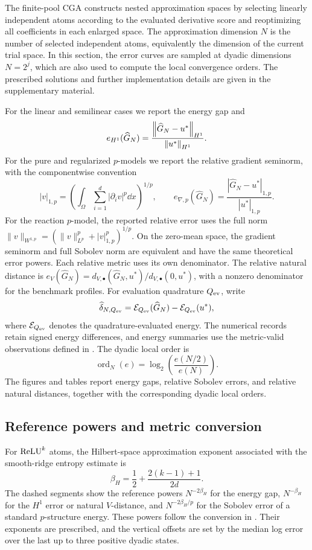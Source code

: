The finite-pool CGA constructs nested approximation spaces by selecting linearly independent atoms according to the evaluated derivative score and reoptimizing all coefficients in each enlarged space. The approximation dimension \(N\) is the number of selected independent atoms, equivalently the dimension of the current trial space. In this section, the error curves are sampled at dyadic dimensions \(N=2^j\), which are also used to compute the local convergence orders. The prescribed solutions and further implementation details are given in the supplementary material.

For the linear and semilinear cases we report the energy gap and
\[
 e_{H^1}(\widehat G_N)=\frac{\left\lVert \widehat G_N-u^*\right\rVert_{H^1}}{\left\lVert u^*\right\rVert_{H^1}}.
\]
For the pure and regularized \(p\)-models we report the relative gradient
seminorm, with the componentwise convention
\[
 |v|_{1,p}=\left(\int_\Omega\sum_{i=1}^d|\partial_i v|^p\dd x\right)^{1/p},
 \qquad e_{\nabla,p}(\widehat G_N)=
 \frac{|\widehat G_N-u^*|_{1,p}}{|u^*|_{1,p}}.
\]
For the reaction \(p\)-model, the reported relative error uses the full norm
\(\|v\|_{W^{1,p}}=(\|v\|_{L^p}^p+|v|_{1,p}^p)^{1/p}\).
On the zero-mean space, the gradient seminorm and full Sobolev norm are equivalent and have the same theoretical error powers. Each relative metric uses its own denominator. The relative natural distance is \(e_V(\widehat G_N)=d_{V,\bullet}(\widehat G_N,u^*)/d_{V,\bullet}(0,u^*)\), with a nonzero denominator for the benchmark profiles. For evaluation quadrature \(Q_{\rm ev}\), write
\[
 \widehat\delta_{N,Q_{\rm ev}}=\mathcal{E}_{Q_{\rm ev}}(\widehat G_N)-\mathcal{E}_{Q_{\rm ev}}(u^*),
\]
where \(\mathcal{E}_{Q_{\rm ev}}\) denotes the quadrature-evaluated energy. The numerical records retain signed energy differences, and energy summaries use the metric-valid observations defined in .
The dyadic local order is
\[
 \operatorname{ord}_N(e)=\log_2\!\left(\frac{e(N/2)}{e(N)}\right).
\]
The figures and tables report energy gaps, relative Sobolev errors, and relative natural distances, together with the corresponding dyadic local orders.

\subsection{Reference powers and metric conversion}

For \(\operatorname{ReLU}^k\) atoms, the Hilbert-space approximation exponent associated with the smooth-ridge
entropy estimate is
\[
 \beta_H=\frac12+\frac{2(k-1)+1}{2d}.
\]
The dashed segments show the reference powers \(N^{-2\beta_H}\) for the energy gap, \(N^{-\beta_H}\) for the \(H^1\) error or natural \(V\)-distance, and \(N^{-2\beta_H/p}\) for the Sobolev error of a standard \(p\)-structure energy. These powers follow the conversion in . Their exponents are prescribed, and the vertical offsets are set by the median log error over the last up to three positive dyadic states.

